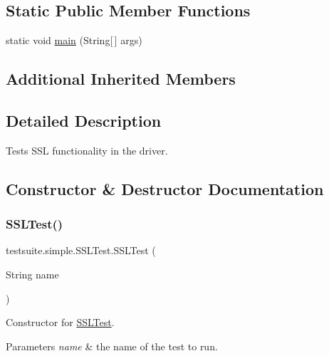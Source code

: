 \subsection*{Static Public Member Functions}
\begin{DoxyCompactItemize}
\item 
static void \mbox{\hyperlink{classtestsuite_1_1simple_1_1_s_s_l_test_a0435dcfc4b0a69d7653db1f50647ce9f}{main}} (String\mbox{[}$\,$\mbox{]} args)
\end{DoxyCompactItemize}
\subsection*{Additional Inherited Members}


\subsection{Detailed Description}
Tests S\+SL functionality in the driver. 

\subsection{Constructor \& Destructor Documentation}
\mbox{\label{classtestsuite_1_1simple_1_1_s_s_l_test_abdad6d8bc69a88f4a2f2f028f90cf287}} 
\subsubsection{\texorpdfstring{S\+S\+L\+Test()}{SSLTest()}}
{\footnotesize\ttfamily testsuite.\+simple.\+S\+S\+L\+Test.\+S\+S\+L\+Test (\begin{DoxyParamCaption}\item[{String}]{name }\end{DoxyParamCaption})}

Constructor for \mbox{\hyperlink{classtestsuite_1_1simple_1_1_s_s_l_test}{S\+S\+L\+Test}}.


\begin{DoxyParams}{Parameters}
{\em name} & the name of the test to run. \\
\hline
\end{DoxyParams}


